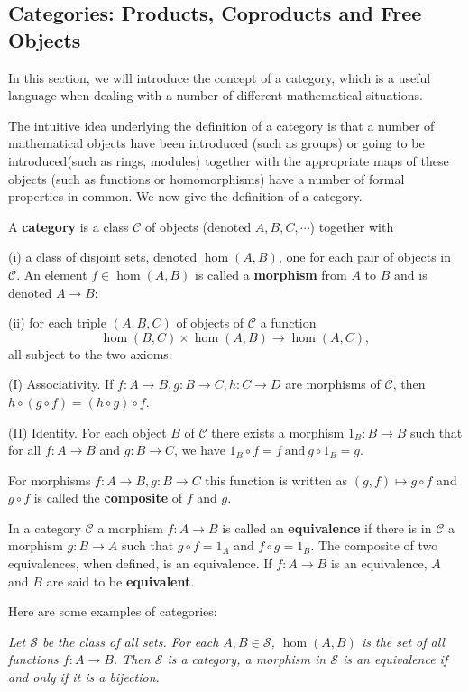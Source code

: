 \subsection{Categories: Products, Coproducts and Free Objects}
In this section, we will introduce the concept of a category, which is a useful language when dealing with a number of different mathematical situations.\par
The intuitive idea underlying the definition of a category is that a number of mathematical objects have been introduced (such as groups) or going to be introduced(such as rings, modules) together with the appropriate maps of these objects (such as functions or homomorphisms) have a number of formal properties in common. We now give the definition of a category.
\begin{definition}
A \textbf{category} is a class $\mathcal{C}$ of objects (denoted $A,B,C,\cdots$) together with\par
(i) a class of disjoint sets, denoted $\hom(A,B)$, one for each pair of objects in $\mathcal{C}$. An element $f\in\hom(A,B)$ is called a \textbf{morphism} from $A$ to $B$ and is denoted $A\to B$;\par
(ii) for each triple $(A,B,C)$ of objects of $\mathcal{C}$ a function
$$\hom(B,C)\times\hom(A,B)\to\hom(A,C),$$
all subject to the two axioms:\par
(I) Associativity. If $f:A\to B,g:B\to C,h:C\to D$ are morphisms of $\mathcal{C}$, then $h\circ(g\circ f)=(h\circ g)\circ f$.\par
(II) Identity. For each object $B$ of $\mathcal{C}$ there exists a morphism $1_B:B\to B$ such that for all $f:A\to B$ and $g:B\to C$, we have 
$1_B\circ f=f \ \text{and} \ g\circ 1_B=g$.
\end{definition}
For morphisms $f:A\to B,g:B\to C$ this function is written as $(g,f)\mapsto g\circ f$ and $g\circ f$ is called the \textbf{composite} of $f$ and $g$.\par
In a category $\mathcal{C}$ a morphism $f:A\to B$ is called an \textbf{equivalence} if there is in $\mathcal{C}$ a morphism $g:B\to A$ such that $g\circ f=1_A$ and $f\circ g=1_B$. The composite of two equivalences, when defined, is an equivalence. If $f:A\to B$ is an equivalence, $A$ and $B$ are said to be \textbf{equivalent}.\par
Here are some examples of categories:\par
\begin{example}\em
Let $\mathcal{S}$ be the class of all sets. For each $A,B\in\mathcal{S}$, $\hom(A,B)$ is the set of all functions $f:A\to B$. Then $\mathcal{S}$ is a category, a morphism in $\mathcal{S}$ is an equivalence if and only if it is a bijection.
\end{example}
